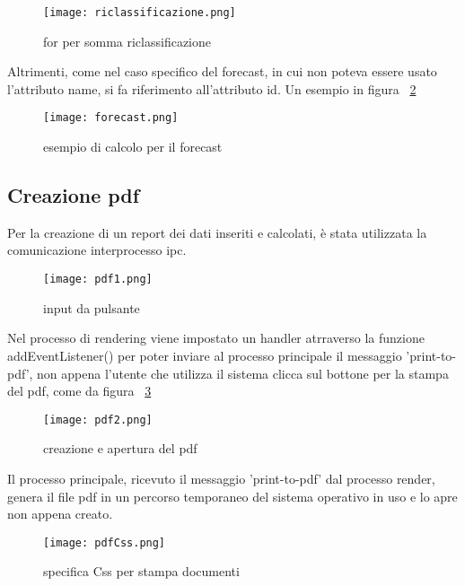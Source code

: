\begin{figure}[H]
    \centering
    \texttt{[image: riclassificazione.png]}
    \caption{for per somma riclassificazione}
    \label{fig:riclassificazione}
\end{figure}

\newpage

Altrimenti, come nel caso specifico del forecast, in cui non poteva essere usato l'attributo name, si fa riferimento all'attributo id. Un esempio in figura ~\ref{fig:forecast}

\begin{figure}[H]
    \centering
    \texttt{[image: forecast.png]}
    \caption{esempio di calcolo per il forecast}
    \label{fig:forecast}
\end{figure}


\subsection {Creazione pdf}

Per la creazione di un report dei dati inseriti e calcolati, è stata utilizzata la comunicazione interprocesso \Gls{ipc}. 

\begin{figure}[H]
    \centering
    \texttt{[image: pdf1.png]}
    \caption{input da pulsante}
    \label{fig:pdf1}
\end{figure}

Nel processo di rendering viene impostato un handler atrraverso la funzione addEventListener() per poter inviare al processo principale il messaggio 'print-to-pdf', non appena l'utente che utilizza il sistema clicca sul bottone per la stampa del pdf, come da figura ~\ref{fig:pdf1}

\begin{figure}[H]
    \centering
    \texttt{[image: pdf2.png]}
    \caption{creazione e apertura del pdf}
    \label{fig:pdf2}
\end{figure}

Il processo principale, ricevuto il messaggio 'print-to-pdf' dal processo render, genera il file pdf in un percorso temporaneo del sistema operativo in uso e lo apre non appena creato.

\begin{figure}[H]
    \centering
    \texttt{[image: pdfCss.png]}
    \caption{specifica Css per stampa documenti}
    \label{fig:pdfCss}
\end{figure}


